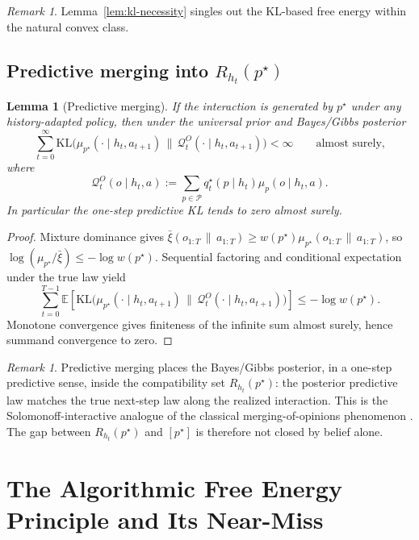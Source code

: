 \documentclass[11pt]{article}
\newtheorem{lemma}[theorem]{Lemma}
\theoremstyle{definition}
\theoremstyle{remark}
\newtheorem{remark}[theorem]{Remark}
\newcommand{\Pcal}{\mathcal{P}}
\newcommand{\Qcal}{\mathcal{Q}}
\newcommand{\E}{\mathbb{E}}
\newcommand{\KL}{\mathrm{KL}}
\newcommand{\givena}{\,\|\,}
\newcommand{\barxi}{\bar{\xi}}
\begin{document}
\begin{remark}
Lemma~\ref{lem:kl-necessity} singles out the KL-based free energy within the natural convex class.
\end{remark}

\subsection{Predictive merging into $R_{h_t}(p^\star)$}

\begin{lemma}[Predictive merging]
\label{lem:merging}
If the interaction is generated by $p^\star$ under any history-adapted policy, then under the universal prior and Bayes/Gibbs posterior
\[
\sum_{t=0}^{\infty}
\KL\!\bigl(\mu_{p^\star}(\cdot\mid h_t,a_{t+1})\,\|\,\Qcal_t^O(\cdot\mid h_t,a_{t+1})\bigr)
<\infty
\qquad
\text{almost surely,}
\]
where
\[
\Qcal_t^O(o\mid h_t,a):=\sum_{p\in\Pcal} q_t^\star(p\mid h_t)\mu_p(o\mid h_t,a).
\]
In particular the one-step predictive KL tends to zero almost surely.
\end{lemma}

\begin{proof}
Mixture dominance gives $\barxi(o_{1:T}\givena a_{1:T})\ge w(p^\star)\mu_{p^\star}(o_{1:T}\givena a_{1:T})$, so $\log(\mu_{p^\star}/\barxi)\le -\log w(p^\star)$. Sequential factoring and conditional expectation under the true law yield
\[
\sum_{t=0}^{T-1}\E\!\left[\KL\!\bigl(\mu_{p^\star}(\cdot\mid h_t,a_{t+1})\,\|\,\Qcal_t^O(\cdot\mid h_t,a_{t+1})\bigr)\right]
\le -\log w(p^\star).
\]
Monotone convergence gives finiteness of the infinite sum almost surely, hence summand convergence to zero.
\end{proof}

\begin{remark}
Predictive merging places the Bayes/Gibbs posterior, in a one-step predictive sense, inside the compatibility set $R_{h_t}(p^\star)$: the posterior predictive law matches the true next-step law along the realized interaction. This is the Solomonoff-interactive analogue of the classical merging-of-opinions phenomenon \citep{BlackwellDubins1962}. The gap between $R_{h_t}(p^\star)$ and $[p^\star]$ is therefore not closed by belief alone.
\end{remark}

\section{The Algorithmic Free Energy Principle and Its Near-Miss}
\label{sec:near-miss}
\end{document}

